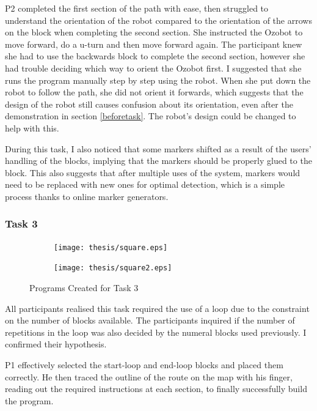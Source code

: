 \documentclass[oneside,%
                    author={Malak Hajji},
                    degree={BSc},
                    title={Designing An Accessible Ozobot Programming Platform for Students},
                  subtitle={With Mixed Visual Abilities}]{dissertation}
\begin{document}
P2 completed the first section of the path with ease, then struggled to understand the orientation of the robot compared to the orientation of the arrows on the block when completing the second section. She instructed the Ozobot to move forward, do a u-turn and then move forward again. The participant knew she had to use the backwards block to complete the second section, however she had trouble deciding which way to orient the Ozobot first. I suggested that she runs the program manually step by step using the robot. When she put down the robot to follow the path, she did not orient it forwards, which suggests that the design of the robot still causes confusion about its orientation, even after the demonstration in section \ref{beforetask}. The robot's design could be changed to help with this. 

During this task, I also noticed that some markers shifted as a result of the users' handling of the blocks, implying that the markers should be properly glued to the block. This also suggests that after multiple uses of the system, markers would need to be replaced with new ones for optimal detection, which is a simple process thanks to online marker generators.

\subsubsection{Task 3}
\FloatBarrier

\begin{figure}[h]
\centering
\begin{subfigure}{.5\textwidth}
  \centering
  \texttt{[image: thesis/square.eps]}
  \label{fig-square}
\end{subfigure}%
\begin{subfigure}{.5\textwidth}
  \centering
  \texttt{[image: thesis/square2.eps]}
 
  \label{fig-square2}
\end{subfigure}
\caption{Programs Created for Task 3}
\label{fig-task3}
\end{figure}
\FloatBarrier
All participants realised this task required the use of a loop due to the constraint on the number of blocks available. The participants inquired if the number of repetitions in the loop was also decided by the numeral blocks used previously. I confirmed their hypothesis. 

P1 effectively selected the start-loop and end-loop blocks and placed them correctly. He then traced the outline of the route on the map with his finger, reading out the required instructions at each section, to finally successfully build the program.
\end{document}
